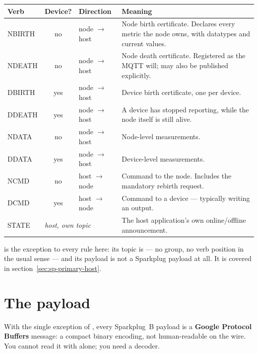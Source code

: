 \begin{center}
\begin{tabular}{@{}>{\ttfamily}l c l p{6.3cm}@{}}
\toprule
\normalfont\textbf{Verb} & \textbf{Device?} & \textbf{Direction} & \textbf{Meaning} \\
\midrule
NBIRTH & no  & node $\rightarrow$ host & Node birth certificate. Declares every metric the
                                         node owns, with datatypes and current values. \\
NDEATH & no  & node $\rightarrow$ host & Node death certificate. Registered as the MQTT
                                         will; may also be published explicitly. \\
DBIRTH & yes & node $\rightarrow$ host & Device birth certificate, one per device. \\
DDEATH & yes & node $\rightarrow$ host & A device has stopped reporting, while the node
                                         itself is still alive. \\
NDATA  & no  & node $\rightarrow$ host & Node-level measurements. \\
DDATA  & yes & node $\rightarrow$ host & Device-level measurements. \\
NCMD   & no  & host $\rightarrow$ node & Command to the node. Includes the mandatory
                                         rebirth request. \\
DCMD   & yes & host $\rightarrow$ node & Command to a device --- typically writing an
                                         output. \\
STATE  & \multicolumn{2}{l}{\emph{host, own topic}} & The host application's own
                                         online/offline announcement. \\
\bottomrule
\end{tabular}
\end{center}

 is the exception to every rule here: its topic is
 --- no group, no verb position in the usual sense
--- and its payload is not a Sparkplug payload at all. It is covered in
section~\ref{sec:sp-primary-host}.

\section{The payload}

With the single exception of , every Sparkplug~B payload is a
\textbf{Google Protocol Buffers} message: a compact binary encoding, not human-readable on
the wire. You cannot read it with  alone; you need a decoder.

